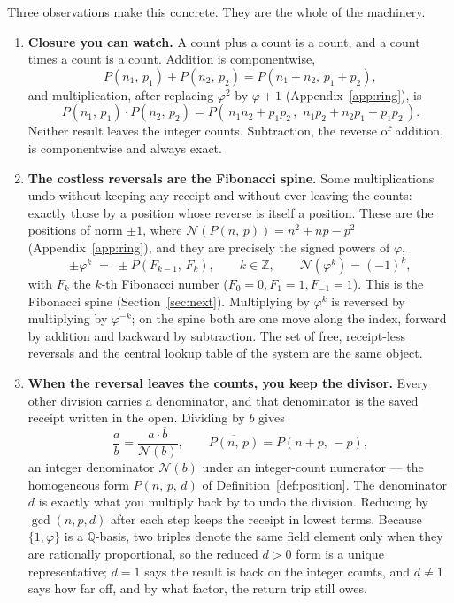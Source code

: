 \documentclass[11pt]{article}
\theoremstyle{definition}
\theoremstyle{remark}
\newcommand{\Z}{\mathbb{Z}}
\newcommand{\Q}{\mathbb{Q}}
\newcommand{\Pb}[2]{P(#1,\,#2)}
\newcommand{\Pbd}[3]{P(#1,\,#2,\,#3)}
\newcommand{\Norm}{\mathcal{N}}
\begin{document}
Three observations make this concrete. They are the whole of the machinery.

\begin{enumerate}[leftmargin=*]
\item \textbf{Closure you can watch.}
  A count plus a count is a count, and a count times a count is a count.
  Addition is componentwise,
  \[
    \Pb{n_1}{p_1}+\Pb{n_2}{p_2}=\Pb{n_1+n_2}{p_1+p_2},
  \]
  and multiplication, after replacing $\varphi^2$ by $\varphi+1$
  (Appendix~\ref{app:ring}), is
  \[
    \Pb{n_1}{p_1}\cdot\Pb{n_2}{p_2}
      =\Pb{\,n_1 n_2 + p_1 p_2\,}{\,n_1 p_2 + n_2 p_1 + p_1 p_2\,}.
  \]
  Neither result leaves the integer counts. Subtraction, the reverse of
  addition, is componentwise and always exact.

\item \textbf{The costless reversals are the Fibonacci spine.}
  Some multiplications undo without keeping any receipt and without ever leaving
  the counts: exactly those by a position whose reverse is itself a position.
  These are the positions of norm $\pm1$, where
  $\Norm(\Pb{n}{p})=n^2+np-p^2$ (Appendix~\ref{app:ring}), and they are precisely
  the signed powers of $\varphi$,
  \[
    \pm\varphi^k \;=\; \pm\Pb{F_{k-1}}{F_k},\qquad k\in\Z,
    \qquad \Norm(\varphi^k)=(-1)^k,
  \]
  with $F_k$ the $k$-th Fibonacci number ($F_0=0,F_1=1,F_{-1}=1$). This is the
  Fibonacci spine (Section~\ref{sec:next}). Multiplying by $\varphi^k$ is
  reversed by multiplying by $\varphi^{-k}$; on the spine both are one move along
  the index, forward by addition and backward by subtraction. The set of free,
  receipt-less reversals and the central lookup table of the system are the same
  object.

\item \textbf{When the reversal leaves the counts, you keep the divisor.}
  Every other division carries a denominator, and that denominator is the saved
  receipt written in the open. Dividing by $b$ gives
  \[
    \frac{a}{b}=\frac{a\cdot\overline{b}}{\Norm(b)},
    \qquad \overline{\Pb{n}{p}}=\Pb{n+p}{-p},
  \]
  an integer denominator $\Norm(b)$ under an integer-count numerator --- the
  homogeneous form $\Pbd{n}{p}{d}$ of Definition~\ref{def:position}. The
  denominator $d$ is exactly what you multiply back by to undo the division.
  Reducing by $\gcd(n,p,d)$ after each step keeps the receipt in lowest terms.
  Because $\{1,\varphi\}$ is a $\Q$-basis, two triples denote the same field
  element only when they are rationally proportional, so the reduced $d>0$ form
  is a unique representative; $d=1$ says the result is back on the integer
  counts, and $d\ne1$ says how far off, and by what factor, the return trip still
  owes.
\end{enumerate}
\end{document}
